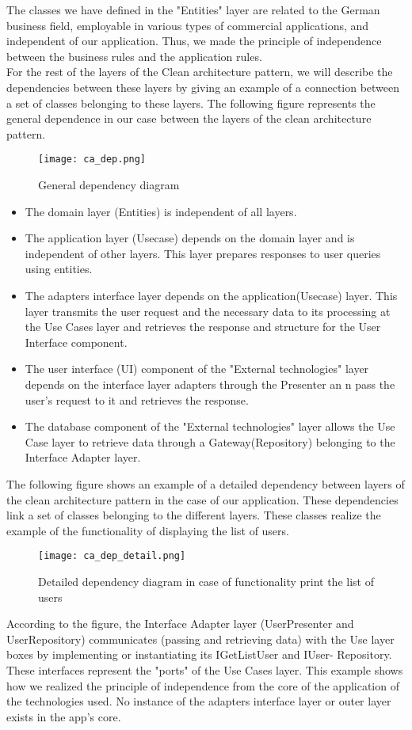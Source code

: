\begin{itemize}
\begin{itemize}
\end{itemize}
\end{itemize}
The classes we have defined in the "Entities" layer are related to the German business field, employable in various types of commercial applications, and
independent of our application. Thus, we made the
principle of independence between the business rules and the application rules.\\
For the rest of the layers of the Clean architecture pattern, we will describe
the dependencies between these layers by giving an example of a connection between a
set of classes belonging to these layers.
The following figure represents the general dependence in our case between the
layers of the clean architecture pattern.
\begin{figure}[H]%
    \center   
    \texttt{[image: ca\_dep.png]}
    \caption{General dependency diagram}
\end{figure}
\begin{itemize}
\item The domain layer (Entities) is independent of all layers.
\item The application layer (Usecase) depends on the domain layer and is independent of other layers. This layer prepares responses to
user queries using entities.
\item The adapters interface layer depends on the application(Usecase) layer.
This layer transmits the user request and the necessary data
to its processing at the Use Cases layer and retrieves the response and structure
for the User Interface component.
\item The user interface (UI) component of the "External technologies" layer
depends on the interface layer adapters through the Presenter an n
pass the user's request to it and retrieves the response.
\item The database component of the "External technologies" layer
allows the Use Case layer to retrieve data through a
Gateway(Repository) belonging to the Interface Adapter layer.

\end{itemize}
The following figure shows an example of a detailed dependency between
layers of the clean architecture pattern in the case of our application. These dependencies link a set of classes belonging to the different layers.
These classes realize the example of the functionality of displaying the list of
users.
\begin{figure}[H]%
    \center   
    \texttt{[image: ca\_dep\_detail.png]}
    \caption{Detailed dependency diagram in case of functionality
print the list of users}
\end{figure}
According to the figure, the Interface Adapter layer (UserPresenter and UserRepository)
communicates (passing and retrieving data) with the Use layer
boxes by implementing or instantiating its IGetListUser and IUser-
Repository. These interfaces represent the "ports" of the Use Cases layer.
This example shows how we realized the principle of independence
from the core of the application of the technologies used. No instance of the
adapters interface layer or outer layer exists in the app's core.

